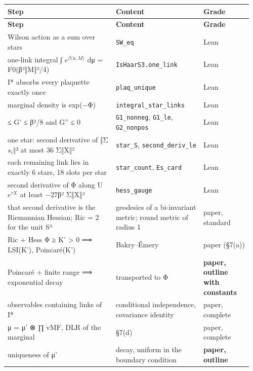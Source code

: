 \documentclass[11pt,a4paper]{article}
\theoremstyle{named}
\begin{document}
\begin{small}
\begin{longtable}{>{\raggedright\arraybackslash}p{0.422\linewidth}>{\raggedright\arraybackslash}p{0.347\linewidth}>{\raggedright\arraybackslash}p{0.191\linewidth}}
\hline
\textbf{Step} & \textbf{Content} & \textbf{Grade} \\
\hline
\endfirsthead
\hline
\textbf{Step} & \textbf{Content} & \textbf{Grade} \\
\hline
\endhead
\hline
\endfoot
Wilson action as a sum over stars & \texttt{SW\_\allowbreak{}eq} & Lean \\
one-link integral ∫ $e^{β⟨u,M⟩}$ dμ = F0(β²‖M‖²/4) & \texttt{IsHaarS3.\allowbreak{}one\_\allowbreak{}link} & Lean \\
I* absorbs every plaquette exactly once & \texttt{plaq\_\allowbreak{}unique} & Lean \\
marginal density is exp(−Φ) & \texttt{integral\_\allowbreak{}star\_\allowbreak{}links} & Lean \\
0 ≤ G' ≤ β²/8 and G'' ≤ 0 & \texttt{G1\_\allowbreak{}nonneg}, \texttt{G1\_\allowbreak{}le}, \texttt{G2\_\allowbreak{}nonpos} & Lean \\
one star: second derivative of ‖Σ $s_i‖²$ at most 36 Σ‖X‖² & \texttt{star\_\allowbreak{}S}, \texttt{second\_\allowbreak{}deriv\_\allowbreak{}le} & Lean \\
each remaining link lies in exactly 6 stars, 18 slots per star & \texttt{star\_\allowbreak{}count}, \texttt{Es\_\allowbreak{}card} & Lean \\
second derivative of Φ along U $e^{τX}$ at least −27β² Σ‖X‖² & \texttt{hess\_\allowbreak{}gauge} & Lean \\
that second derivative is the Riemannian Hessian; Ric = 2 for the unit S³ & geodesics of a bi-invariant metric; round metric of radius 1 & paper, standard \\
Ric + Hess Φ ≥ K' \textgreater{} 0 ⟹ LSI(K'), Poincaré(K') & Bakry–Émery & paper (\S7(a)) \\
Poincaré + finite range ⟹ exponential decay & [SZZ, Lemma 4.10 and Cor. 4.11] transported to Φ & \textbf{paper, outline with constants} \\
observables containing links of I* & conditional independence, covariance identity & paper, complete \\
μ = μ' ⊗ ∏ vMF, DLR of the marginal & §7(d) & paper, complete \\
uniqueness of μ' & decay, uniform in the boundary condition & \textbf{paper, outline} \\
\hline
\end{longtable}
\end{small}
\end{document}
